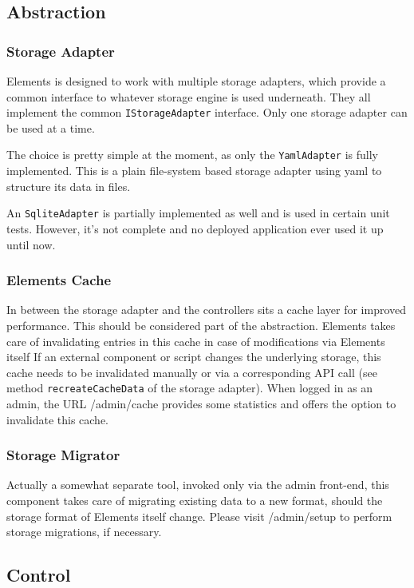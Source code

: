 \documentclass[table]{scrartcl}
\newcommand{\code}[1]{\texttt{#1}}
\begin{document}
\subsection{Abstraction}

\subsubsection{Storage Adapter}
Elements is designed to work with multiple storage adapters, which
provide a common interface to whatever storage engine is used
underneath. They all implement the common \code{IStorageAdapter}
interface. Only one storage adapter can be used at a time.

The choice is pretty simple at the moment, as only the
\code{YamlAdapter} is fully implemented. This is a plain file-system
based storage adapter using \ac{yaml} to structure its data in files.

An \code{SqliteAdapter} is partially implemented as well and is used
in certain unit tests. However, it's not complete and no deployed
application ever used it up until now.

\subsubsection{Elements Cache}
In between the storage adapter and the controllers sits a cache layer
for improved performance. This should be considered part of the
abstraction. Elements takes care of invalidating entries in this cache
in case of modifications via Elements itself If an external component
or script changes the underlying storage, this cache needs to be
invalidated manually or via a corresponding API call (see method
\code{recreateCacheData} of the storage adapter). When logged in as an
admin, the URL /admin/cache provides some statistics and offers the
option to invalidate this cache.

\subsubsection{Storage Migrator}
Actually a somewhat separate tool, invoked only via the admin
front-end, this component takes care of migrating existing data to a
new format, should the storage format of Elements itself
change. Please visit /admin/setup to perform storage migrations, if
necessary.

\subsection{Control}
\end{document}
